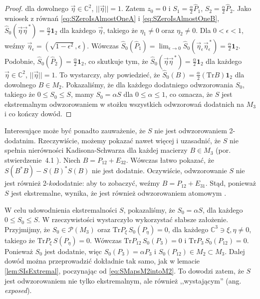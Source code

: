 {\begin{proof}
dla dowolnego $\vec{\eta} \in \mathbb{C}^{2}$, $||\vec{\eta}|| =1$.
Zatem $z_{0} = 0$ i
$S_{1} = \frac{\alpha}{2} \hat{P}_{1}$,
$S_{2} = \frac{\alpha}{2} \hat{P}_{2}$.
Jako wniosek z równań
\eqref{eq:SZeroIsAlmostOneA} i \eqref{eq:SZeroIsAlmostOneB},
$\hat{S}_{0} (\vec{\eta} \vec{\eta}^{\,*}) = \frac{\alpha}{2} \mathbf{1}_{2}$
dla każdego $\vec{\eta}$, takiego że $\eta_{1} \neq 0$ oraz $\eta_{2} \neq 0$.
Dla $0 \!<\!\epsilon \!<\! 1$,
weźmy $\vec{\eta}_{\epsilon} = (\sqrt{1 - \epsilon^{2}}, \epsilon)$.
Wówczas $\hat{S}_{0} (\hat{P}_{1}) =
\lim_{\epsilon \rightarrow 0} \hat{S}_{0}
    (\vec{\eta}_{\epsilon} \vec{\eta}_{\epsilon}^{\,*}) =
\frac{\alpha}{2} \mathbf{1}_{2}$.
Podobnie,
$\hat{S}_{0} (\hat{P}_{2}) = \frac{\alpha}{2} \mathbf{1}_{2}$,
co skutkuje tym, że
$\hat{S}_{0} (\vec{\eta} \vec{\eta}^{\,*}) = \frac{\alpha}{2} \mathbf{1}_{2}$
dla każdego $\vec{\eta} \in \mathbb{C}^{2}$,
$||\vec{\eta}|| = 1$.
To wystarczy, aby powiedzieć, że
$\hat{S}_{0}(B) = \frac{\alpha}{2} (\text{Tr} B) \mathbf{1}_{2}$
dla dowolnego $B \in M_{2}$.
Pokazaliśmy, że dla każdego dodatniego odwzorowania $S_{0}$, takiego że
$0 \leq S_{0} \leq S$, mamy
$S_{0} = \alpha S$ dla $0 \leq \alpha \leq 1$,
co oznacza, że $S$ jest ekstremalnym odwzorowaniem w stożku wszystkich
odwzorowań dodatnich na $M_{3}$ i co kończy dowód.
\end{proof}

Interesujące może być ponadto zauważenie, że $S$ nie jest odwzorowaniem
\mbox{2-dodatnim}.
Rzeczywiście,
możemy pokazać nawet więcej i uzasadnić, że $S$
nie spełnia nierówności Kadisona-Schwarza dla każdej macierzy
$B \in M_{3}$ (por. stwierdzenie \,4.1 \cite{choi1980some}).
Niech
$B = P_{12} + E_{32}$.
Wówczas łatwo pokazać, że
$S(B^{*} B) - S(B)^{*} S(B)$
nie jest dodatnie.
Oczywiście, odwzorowanie $S$ nie jest również 2-\emph{ko}dodatnie:
aby to zobaczyć, weźmy $B = P_{12} + E_{31}$.
Stąd, ponieważ $S$ jest ekstremalne,
wynika, że jest również odwzorowaniem atomowym
\cite{ha1998atomic}.

W celu udowodnienia ekstremalności $S$,
pokazaliśmy, że $S_{0} = \alpha S$,
dla każdego $0 \leq S_{0} \leq S$.
W rzeczywistości wystarczyło wykorzystać słabsze założenie.
Przyjmijmy, że $S_{0} \in \mathcal{P}(M_{3})$ oraz
$\text{Tr} P_{\xi} \, S_{0}(P_{\eta}) = 0$,
dla każdego $\mathbb{C}^{3} \ni \xi,\eta \neq 0$,
takiego że $\text{Tr} P_{\xi} \, S(P_{\eta}) = 0$.
Wówczas $\text{Tr} P_{12} \, S_{0}(P_{3}) = 0$ i
$\text{Tr} P_{3} \, S_{0}(P_{12}) = 0$.
Ponieważ $S_{0}$ jest dodatnie, więc $S_{0}(P_{3}) = \alpha P_{3}$
i $S_{0}(P_{12}) \in M_{2} \! \subset \! M_{3}$.
Dalej dowód można przeprowadzić dokładnie tak samo, jak w
lemacie \ref{lem:SIsExtremal},
poczynając od \eqref{eq:SMapsM2intoM2}.
To dowodzi zatem, że $S$ jest odwzorowaniem nie tylko ekstremalnym,
ale również ,,wystającym'' (ang. \emph{exposed}).

}
